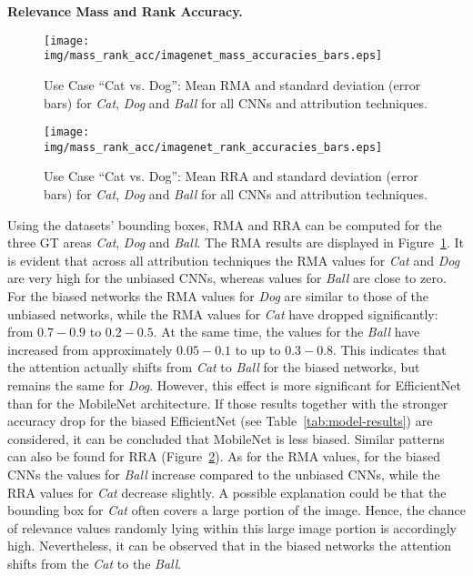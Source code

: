 \documentclass[runningheads]{llncs}
\newcommand{\Fig}[1]{Figure~\ref{#1}}
\newcommand{\Tab}[1]{Table~\ref{#1}}
\begin{document}
\textbf{Relevance Mass and Rank Accuracy.}
\begin{figure}[t]
    \centering
    \texttt{[image: img/mass\_rank\_acc/imagenet\_mass\_accuracies\_bars.eps]}
    \caption{Use Case \enquote{Cat vs. Dog}: Mean RMA and standard deviation (error bars) for \emph{Cat}, \emph{Dog} and \emph{Ball} for all CNNs and attribution techniques.}
    \label{fig:mass-accuracy-imgnet}
\end{figure}
\begin{figure}[t]
    \centering
    \texttt{[image: img/mass\_rank\_acc/imagenet\_rank\_accuracies\_bars.eps]}
    \caption{Use Case \enquote{Cat vs. Dog}: Mean RRA and standard deviation (error bars) for \emph{Cat}, \emph{Dog} and \emph{Ball} for all CNNs and attribution techniques.}
    \label{fig:rank-accuracy-imgnet}
    \vspace{-4mm}
\end{figure}
Using the datasets' bounding boxes, RMA and RRA can be computed for the three GT areas \emph{Cat}, \emph{Dog} and \emph{Ball}. The RMA results are displayed in \Fig{fig:mass-accuracy-imgnet}. It is evident that across all attribution techniques the RMA values for \emph{Cat} and \emph{Dog} are very high for the unbiased CNNs, whereas values for \emph{Ball} are close to zero. For the biased networks the RMA values for \emph{Dog} are similar to those of the unbiased networks, while the RMA values for \emph{Cat} have dropped significantly: from $0.7-0.9$ to $0.2-0.5$. At the same time, the values for the \emph{Ball} have increased from approximately $0.05-0.1$ to up to $0.3-0.8$. This indicates that the attention actually shifts from \emph{Cat} to \emph{Ball} for the biased networks, but remains the same for \emph{Dog}. However, this effect is more significant for EfficientNet than for the MobileNet architecture. If those results together with the stronger accuracy drop for the biased EfficientNet (see \Tab{tab:model-results}) are considered, it can be concluded that MobileNet is less biased.
Similar patterns can also be found for RRA (\Fig{fig:rank-accuracy-imgnet}). As for the RMA values, for the biased CNNs the values for \emph{Ball} increase compared to the unbiased CNNs, while the RRA values for \emph{Cat} decrease slightly. A possible explanation could be that the bounding box for \emph{Cat} often covers a large portion of the image. Hence, the chance of relevance values randomly lying within this large image portion is accordingly high. Nevertheless, it can be observed that in the biased networks the attention shifts from the \emph{Cat} to the \emph{Ball}.
\end{document}
